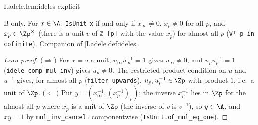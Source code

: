 \begin{lemma}
\bonly
{}
\end{lemma}
\begin{tfformal}{I.adele.lem:ideles-explicit}
\begin{tffidelity}
B-only. For $x\in\A$: \texttt{IsUnit x} if and only if $x_\infty\neq0$, $x_p\neq0$ for all $p$, and $x_p\in\Zp^\times$ (there is a unit $v$ of \texttt{ℤ\_[p]} with the value $x_p$) for almost all $p$ (\texttt{∀ᶠ p in cofinite}). Companion of \cref{I.adele.def:ideles}.
\end{tffidelity}
\end{tfformal}
\begin{proof}[Lean proof]
($\Rightarrow$) For $x=u$ a unit, $u_\infty u^{-1}_\infty=1$ gives $u_\infty\ne0$, and $u_pu^{-1}_p=1$ (\texttt{idele\_comp\_mul\_inv}) gives $u_p\ne0$. The restricted-product condition on $u$ and $u^{-1}$ gives, for almost all $p$ (\texttt{filter\_upwards}), $u_p,u^{-1}_p\in\Zp$ with product $1$, i.e.\ a unit of $\Zp$. ($\Leftarrow$) Put $y=(x_\infty^{-1},(x_p^{-1})_p)$; the inverse $x_p^{-1}$ lies in $\Zp$ for the almost all $p$ where $x_p$ is a unit of $\Zp$ (the inverse of $v$ is $v^{-1}$), so $y\in\A$, and $xy=1$ by \texttt{mul\_inv\_cancel₀} componentwise (\texttt{IsUnit.of\_mul\_eq\_one}).
\end{proof}

